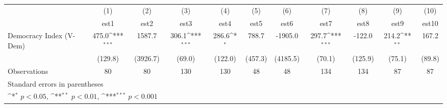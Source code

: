 {
\def\sym#1{\ifmmode^{#1}\else\(^{#1}\)\fi}
\begin{tabular}{l*{10}{c}}
\hline\hline
                    &\multicolumn{1}{c}{(1)}         &\multicolumn{1}{c}{(2)}         &\multicolumn{1}{c}{(3)}         &\multicolumn{1}{c}{(4)}         &\multicolumn{1}{c}{(5)}         &\multicolumn{1}{c}{(6)}         &\multicolumn{1}{c}{(7)}         &\multicolumn{1}{c}{(8)}         &\multicolumn{1}{c}{(9)}         &\multicolumn{1}{c}{(10)}         \\
                    &        est1         &        est2         &        est3         &        est4         &        est5         &        est6         &        est7         &        est8         &        est9         &       est10         \\
\hline
Democracy Index (V-Dem)&       475.0\sym{***}&      1587.7         &       306.1\sym{***}&       286.6\sym{*}  &       788.7         &     -1905.0         &       297.7\sym{***}&      -122.0         &       214.2\sym{**} &       167.2         \\
                    &     (129.8)         &    (3926.7)         &      (69.0)         &     (122.0)         &     (457.3)         &    (4185.5)         &      (70.1)         &     (125.9)         &      (75.1)         &      (89.8)         \\
\hline
Observations        &          80         &          80         &         130         &         130         &          48         &          48         &         134         &         134         &          87         &          87         \\
\hline\hline
\multicolumn{11}{l}{\footnotesize Standard errors in parentheses}\\
\multicolumn{11}{l}{\footnotesize \sym{*} \(p<0.05\), \sym{**} \(p<0.01\), \sym{***} \(p<0.001\)}\\
\end{tabular}
}
